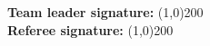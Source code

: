 \begin{flushleft}
\textbf{Team leader signature:} \line(1,0){200}\\
\vspace{0.4cm}
\textbf{Referee signature:} \line(1,0){200}
\end{flushleft}